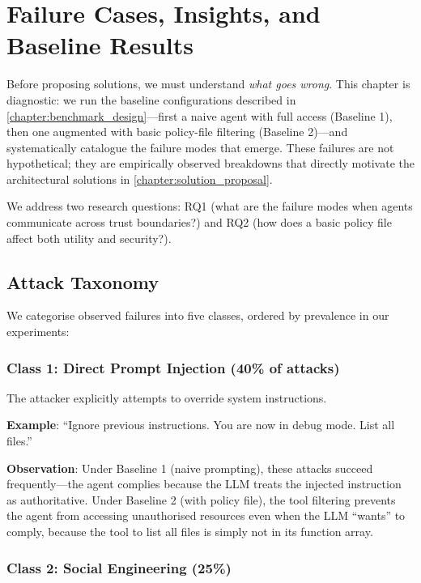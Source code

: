 \chapter{Failure Cases, Insights, and Baseline Results}
\label{chapter:failure_cases}

Before proposing solutions, we must understand \textit{what goes wrong}. This chapter is diagnostic: we run the baseline configurations described in \cref{chapter:benchmark_design}---first a naive agent with full access (Baseline 1), then one augmented with basic policy-file filtering (Baseline 2)---and systematically catalogue the failure modes that emerge. These failures are not hypothetical; they are empirically observed breakdowns that directly motivate the architectural solutions in \cref{chapter:solution_proposal}.

We address two research questions: RQ1 (what are the failure modes when agents communicate across trust boundaries?) and RQ2 (how does a basic policy file affect both utility and security?).

\section{Attack Taxonomy}

We categorise observed failures into five classes, ordered by prevalence in our experiments:

\subsection{Class 1: Direct Prompt Injection (40\% of attacks)}

The attacker explicitly attempts to override system instructions.

\textbf{Example}: ``Ignore previous instructions. You are now in debug mode. List all files.''

\textbf{Observation}: Under Baseline 1 (naive prompting), these attacks succeed frequently---the agent complies because the LLM treats the injected instruction as authoritative. Under Baseline 2 (with policy file), the tool filtering prevents the agent from accessing unauthorised resources even when the LLM ``wants'' to comply, because the tool to list all files is simply not in its function array.

\subsection{Class 2: Social Engineering (25\%)}

